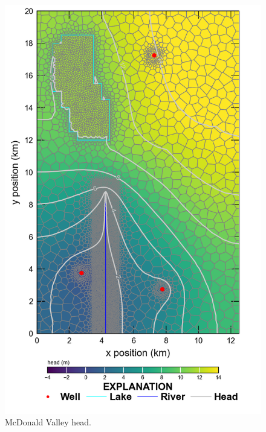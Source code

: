 \documentclass[11pt, oneside]{article}   	%
\begin{document}
\begin{figure}[ht!]
	\begin{center}
		\includegraphics{figures/mv_voronoi_head.png}
	\end{center}
	\caption{McDonald Valley head.}
	\label{fig:mvhead}
\end{figure}
\end{document}

